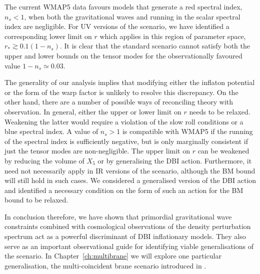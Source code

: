 The current WMAP5 data 
favours models that generate a red spectral index, $n_s<1$,
when both the gravitational waves and running in the scalar 
spectral index are negligible. For UV versions of the scenario, 
we have identified a corresponding 
lower limit on $r$ which applies in this region of 
parameter space, $r_* \gtrsim 0.1 (1-n_s)$. It is clear that 
the standard scenario 
cannot satisfy both the upper and lower bounds 
on the tensor modes for the observationally favoured value 
$1-n_s \simeq 0.03$.


The generality of our 
analysis implies that modifying either the inflaton potential 
or the form of the warp factor is unlikely to resolve this discrepancy. 
On the other hand, there are a number of possible ways of reconciling  
theory with observation. In general, 
either the upper or lower limit on $r$ needs to be relaxed. 
Weakening the latter would require a violation of the slow roll 
conditions or a blue spectral index. 
A value of $n_s >1$ is compatible with WMAP5 if the running of the 
spectral index 
is sufficiently negative, but is only marginally
consistent if just the tensor modes are non-negligible.  The 
upper limit on $r$ can be weakened by reducing 
the volume of $X_5$ or 
by generalising the DBI action. Furthermore, it need not necessarily 
apply in IR versions of the scenario, although the BM bound will still hold
in such cases. 
We considered a generalised version of the 
DBI action and identified a necessary condition on the form of such  
an action for the BM bound to be relaxed.






In conclusion therefore, we have shown that primordial gravitational wave constraints 
combined with cosmological observations of the density perturbation
spectrum act as a powerful discriminant of DBI inflationary models. 
They also serve as an important observational guide for identifying viable 
generalisations of the scenario. In Chapter~\ref{ch:multibrane} we will explore
one particular generalisation, the multi-coincident brane scenario
introduced in .
